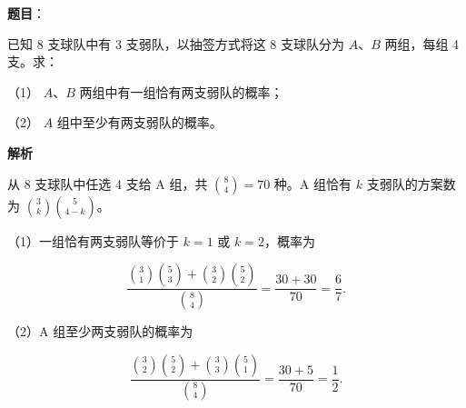 \begin{answer}

\textbf{题目}：

已知 8 支球队中有 3 支弱队，以抽签方式将这 8 支球队分为 $A\text{、}B$ 两组，每组 4 支。求：

（1） $A\text{、}B$ 两组中有一组恰有两支弱队的概率；

（2） $A$ 组中至少有两支弱队的概率。

\textbf{解析}


从 8 支球队中任选 4 支给 A 组，共 $\binom84=70$ 种。A 组恰有 $k$ 支弱队的方案数为 $\binom3k\binom5{4-k}$。

（1）一组恰有两支弱队等价于 $k=1$ 或 $k=2$，概率为

\nopagebreak[4]
\[
\frac{\binom31\binom53+\binom32\binom52}{\binom84}
=\frac{30+30}{70}=\frac67.
\]


（2）A 组至少两支弱队的概率为

\nopagebreak[4]
\[
\frac{\binom32\binom52+\binom33\binom51}{\binom84}
=\frac{30+5}{70}=\frac12.
\]



\end{answer}
